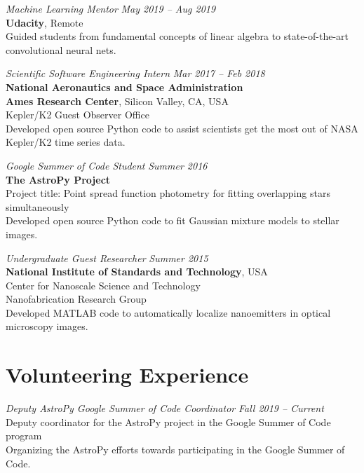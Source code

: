 \documentclass[10pt]{article}
\begin{document}
\begin{titlepage}
\emph{Machine Learning Mentor} \hfill \textit{May 2019  -- Aug 2019}
\\\textbf{Udacity}, Remote
\\ {\small Guided students from fundamental concepts of linear algebra to state-of-the-art convolutional neural nets.}
\vspace{.5cm}

\emph{Scientific Software Engineering Intern} \hfill \textit{Mar 2017 -- Feb 2018}
\\\textbf{National Aeronautics and Space Administration}
\\\textbf{Ames Research Center}, Silicon Valley, CA, USA
\\Kepler/K2 Guest Observer Office
\\ {\small Developed open source \textsf{Python} code
    to assist scientists get the most out of NASA Kepler/K2 time series data.}
\vspace{.5cm}

\emph{Google Summer of Code Student} \hfill \textit{Summer 2016}
\\\textbf{The AstroPy Project}
\\ Project title: Point spread function photometry for fitting overlapping stars simultaneously
\\ {\small Developed open source \textsf{Python} code
    to fit Gaussian mixture models to stellar images.}
\vspace{.5cm}

\emph{Undergraduate Guest Researcher} \hfill \textit{Summer 2015}
\\\textbf{National Institute of Standards and Technology}, USA
\\Center for Nanoscale Science and Technology
\\Nanofabrication Research Group
\\ {\small Developed \textsf{MATLAB} code to automatically localize nanoemitters in optical microscopy images.}


\section*{Volunteering Experience}
\emph{Deputy AstroPy Google Summer of Code Coordinator} \hfill \textit{Fall 2019 -- Current}
\\Deputy coordinator for the AstroPy project in the Google Summer of Code program
\\ {\small Organizing the AstroPy efforts towards participating in the Google Summer of Code.}
\vspace{.5cm}


\end{titlepage}
\end{document}
